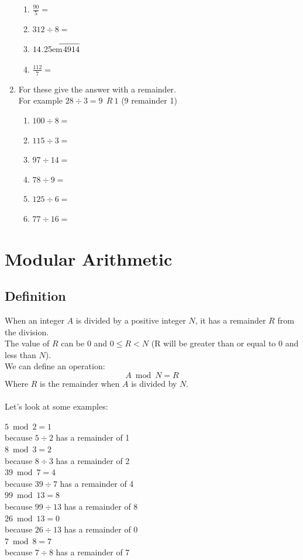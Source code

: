 \documentclass[a4paper,12pt]{article}
\newcommand\Mydiv[2]{%
$\strut#1$\kern.25em\smash{\raise.3ex\hbox{$\big)$}}$\mkern-8mu
        \overline{\enspace\strut#2}$}
\begin{document}
\begin{enumerate}[itemsep=10mm]
\begin{multicols}{3}
\begin{enumerate}[label= \roman*), itemsep=4mm]
\item $\displaystyle \frac{90}{5}=$
\item $312 \div 8=$
\item \Mydiv{14}{4914}
\item $\displaystyle \frac{112}{7}=$
\end{enumerate}
\end{multicols}
\item For these give the answer with a remainder.\\
For example $28 \div 3 = 9~~R~1$ (9 remainder 1)
\begin{multicols}{3}
\begin{enumerate}[label= \roman*), itemsep=4mm]
\item $100 \div 8=$
\item $115 \div 3=$
\item $97 \div 14=$
\item $78 \div 9=$
\item $125 \div 6=$
\item $77 \div 16=$
\end{enumerate}
\end{multicols}
\end{enumerate}
\newpage
\section{Modular Arithmetic}
\subsection{Definition}
When an integer $A$ is divided by a positive integer $N$, it has a remainder $R$ from the division.\\
The value of $R$ can be $0$ and $0\leq R < N$ (R will be greater than or equal to 0 and less than $N$).\\
We can define an operation: $$A \bmod N = R$$
Where $R$ is the remainder when $A$ is divided by $N$.\\\\
Let's look at some examples:
\begin{center}
\begin{multicols}{2}
$5 \bmod 2 = 1$\\
\tiny because $5\div 2$ has a remainder of 1 \normalsize \\
$8 \bmod 3 = 2$\\
\tiny because $8\div 3$ has a remainder of 2 \normalsize \\
$39 \bmod 7 = 4$\\
\tiny because $39\div 7$ has a remainder of 4 \normalsize \\
$99 \bmod 13 = 8$\\
\tiny because $99\div 13$ has a remainder of 8 \normalsize \\
$26 \bmod 13 = 0$\\
\tiny because $26\div 13$ has a remainder of 0 \normalsize\\
$7 \bmod 8 = 7$\\
\tiny because $7\div 8$ has a remainder of 7 \normalsize
\end{multicols}
\end{center}
\end{document}

